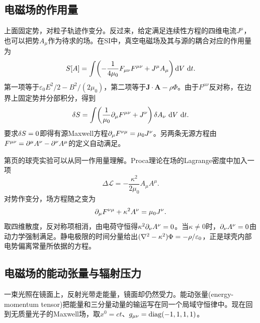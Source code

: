 \subsection{电磁场的作用量}
上面固定势，对粒子轨迹作变分。反过来，给定满足连续性方程的四维电流$J^\mu$，也可以把势$A_\mu$作为待求的场。在SI中，真空电磁场及其与源的耦合对应的作用量为
\begin{equation}
    \label{eq:ed-electromagnetic-action}
    S[A] = \int\biggl(-\frac{1}{4\mu_0}F_{\mu\nu}F^{\mu\nu} + J^\mu A_\mu\biggr)\mathop{}\!\mathrm{d} V\,\mathop{}\!\mathrm{d} t .
\end{equation}
第一项等于$\varepsilon_0 E^2/2 - B^2/(2\mu_0)$，第二项等于$\bm J \cdot \bm A - \rho\Phi$。由于$F^{\mu\nu}$反对称，在边界上固定势并分部积分，得到
\[
    \mathop{}\!\delta S = \int\biggl(\frac{1}{\mu_0}\partial_\mu F^{\mu\nu} + J^\nu\biggr)\mathop{}\!\delta A_\nu\,\mathop{}\!\mathrm{d} V\,\mathop{}\!\mathrm{d} t .
\]
要求$\mathop{}\!\delta S = 0$即得有源Maxwell方程$\partial_\mu F^{\nu\mu} = \mu_0 J^\nu$。另两条无源方程由$F^{\mu\nu} = \partial^\mu A^\nu - \partial^\nu A^\mu$的定义自动满足。

第\pageref{par:photon mass test}页的球壳实验可以从同一作用量理解。Proca理论在场的Lagrange密度中加入一项
\[
    \Delta\mathcal L = -\frac{\kappa^2}{2\mu_0}A_\mu A^\mu .
\]
对势作变分，场方程随之变为
\begin{equation}
    \label{eq:ed-proca-field}
    \partial_\mu F^{\nu\mu} + \kappa^2 A^\nu = \mu_0J^\nu .
\end{equation}
取四维散度，反对称项相消，由电荷守恒得$\kappa^2\partial_\nu A^\nu = 0$。当$\kappa \ne 0$时，$\partial_\nu A^\nu = 0$由动力学强制满足。静电极限的时间分量给出$(\nabla^2 - \kappa^2)\Phi = -\rho/\varepsilon_0$，正是球壳内部电势偏离常量所依据的方程。

\subsection{电磁场的能动张量与辐射压力}
\label{sec:field stress energy}
一束光照在镜面上，反射光带走能量，镜面却仍然受力。能动张量(energy-momentum tensor)把能量和三分量动量的输运写在同一个局域守恒律中。现在回到无质量光子的Maxwell场，取$x^0 = ct$、$g_{\mu\nu} = \operatorname{diag}(-1,1,1,1)$。

